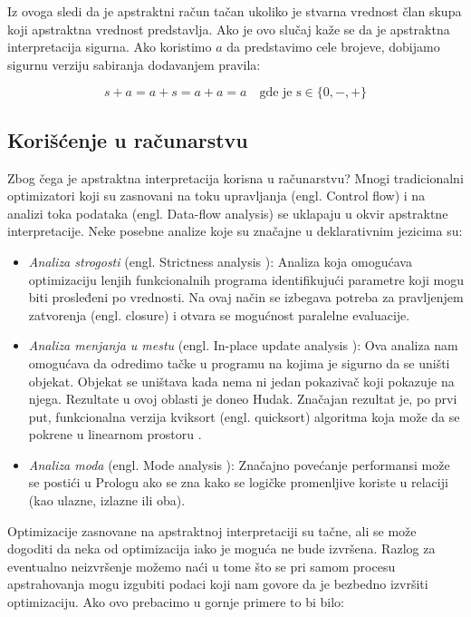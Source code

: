 Iz ovoga sledi da je apstraktni račun tačan ukoliko je stvarna vrednost član skupa koji apstraktna vrednost predstavlja. Ako je ovo slučaj kaže se da je apstraktna interpretacija sigurna. Ako koristimo $a$ da predstavimo cele brojeve, dobijamo sigurnu verziju sabiranja dodavanjem pravila:

	
$$	s + a = a + s = a + a = a \quad \text{gde je s} \in \{0, -, +\} $$ \cite{AbramskyHankin}

\subsection{Korišćenje u računarstvu}
\label{subsec:koriscenje}
Zbog čega je apstraktna interpretacija korisna u računarstvu? Mnogi tradicionalni optimizatori koji su zasnovani na toku upravljanja (engl. Control flow) i na analizi toka podataka (engl. Data-flow analysis) se uklapaju u okvir apstraktne interpretacije. Neke posebne analize koje su značajne u deklarativnim jezicima su:

\begin{itemize}
\item \textit{Analiza strogosti} (engl. Strictness analysis \cite{AbramskyHankin}):
Analiza koja omogućava optimizaciju lenjih funkcionalnih programa identifikujući parametre koji mogu biti prosleđeni po vrednosti. Na ovaj način se izbegava potreba za pravljenjem zatvorenja (engl. closure) i otvara se mogućnost paralelne evaluacije. 

\item \textit{Analiza menjanja u mestu} (engl. In-place update analysis \cite{CannPhd}):
Ova analiza nam omogućava da odredimo tačke u programu na kojima je sigurno da se uništi objekat. Objekat se uništava kada nema ni jedan pokazivač koji pokazuje na njega. Rezultate u ovoj oblasti je doneo Hudak. Značajan rezultat je, po prvi put, funkcionalna verzija kviksort (engl. quicksort) algoritma koja može da se pokrene u linearnom prostoru \cite{Girard1987}. 

\item \textit{Analiza moda} (engl. Mode analysis \cite{AbramskyHankin}):
Značajno povećanje performansi može se postići u Prologu ako se zna kako se logičke promenljive koriste u relaciji (kao ulazne, izlazne ili oba).

\end{itemize}


Optimizacije zasnovane na apstraktnoj interpretaciji su tačne, ali se može dogoditi da neka od optimizacija iako je moguća ne bude izvršena. Razlog za eventualno neizvršenje možemo naći u tome što se pri samom procesu apstrahovanja mogu izgubiti podaci koji nam govore da je bezbedno izvršiti optimizaciju. Ako ovo prebacimo u gornje primere to bi bilo:




